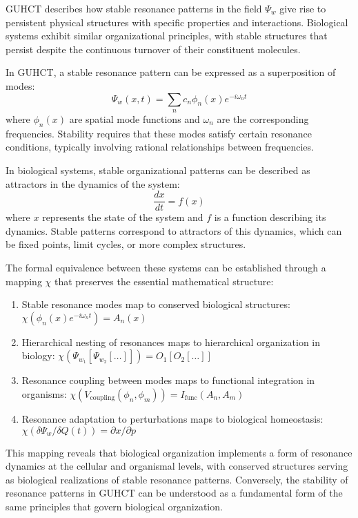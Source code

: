 \documentclass[11pt,a4paper]{article}
\makeatletter
\renewenvironment{proof}[1][\proofname]{\par
  \pushQED{\qed}%
  \normalfont \topsep6\p@\@plus6\p@\relax
  \trivlist
  \item[\hskip\labelsep
        \itshape
    #1\@addpunct{.}]\ignorespaces
}{%
  \popQED\endtrivlist\@endpefalse
}
\makeatother
\begin{document}
\begin{proof}
GUHCT describes how stable resonance patterns in the field $\Psi_w$ give rise to persistent physical structures with specific properties and interactions. Biological systems exhibit similar organizational principles, with stable structures that persist despite the continuous turnover of their constituent molecules.

In GUHCT, a stable resonance pattern can be expressed as a superposition of modes:
\begin{equation}
\Psi_w(x,t) = \sum_n c_n \phi_n(x) e^{-i\omega_n t}
\end{equation}
where $\phi_n(x)$ are spatial mode functions and $\omega_n$ are the corresponding frequencies. Stability requires that these modes satisfy certain resonance conditions, typically involving rational relationships between frequencies.

In biological systems, stable organizational patterns can be described as attractors in the dynamics of the system:
\begin{equation}
\frac{dx}{dt} = f(x)
\end{equation}
where $x$ represents the state of the system and $f$ is a function describing its dynamics. Stable patterns correspond to attractors of this dynamics, which can be fixed points, limit cycles, or more complex structures.

The formal equivalence between these systems can be established through a mapping $\chi$ that preserves the essential mathematical structure:
\begin{enumerate}
    \item Stable resonance modes map to conserved biological structures: $\chi(\phi_n(x) e^{-i\omega_n t}) = A_n(x)$
    \item Hierarchical nesting of resonances maps to hierarchical organization in biology: $\chi(\Psi_{w_1}[\Psi_{w_2}[\ldots]]) = O_1[O_2[\ldots]]$
    \item Resonance coupling between modes maps to functional integration in organisms: $\chi(V_{\text{coupling}}(\phi_n, \phi_m)) = I_{\text{func}}(A_n, A_m)$
    \item Resonance adaptation to perturbations maps to biological homeostasis: $\chi(\delta \Psi_w / \delta Q(t)) = \partial x / \partial p$
\end{enumerate}

This mapping reveals that biological organization implements a form of resonance dynamics at the cellular and organismal levels, with conserved structures serving as biological realizations of stable resonance patterns. Conversely, the stability of resonance patterns in GUHCT can be understood as a fundamental form of the same principles that govern biological organization.


\end{proof}
\end{document}
